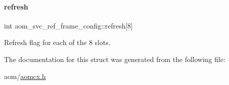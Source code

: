 \paragraph{\texorpdfstring{refresh}{refresh}}
{\footnotesize\ttfamily int aom\+\_\+svc\+\_\+ref\+\_\+frame\+\_\+config\+::refresh\mbox{[}8\mbox{]}}

Refresh flag for each of the 8 slots. 

The documentation for this struct was generated from the following file\+:\begin{DoxyCompactItemize}
\item 
aom/\hyperlink{aomcx_8h}{aomcx.\+h}\end{DoxyCompactItemize}
